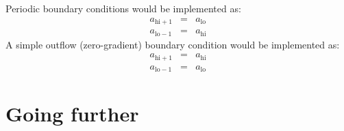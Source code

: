 Periodic boundary conditions would be implemented as:
\begin{eqnarray}
a_{\mathrm{hi}+1} &=& a_\mathrm{lo} \\
a_{\mathrm{lo}-1} &=& a_\mathrm{hi}
\end{eqnarray}
A simple outflow (zero-gradient) boundary condition would be implemented as:
\begin{eqnarray}
a_{\mathrm{hi}+1} &=& a_\mathrm{hi} \\
a_{\mathrm{lo}-1} &=& a_\mathrm{lo}
\end{eqnarray}



\section{Going further}

